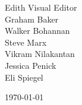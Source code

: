 \documentclass[a4paper, 10pt, oneside]{article}
\begin{document}
\begin{titlepage}
    \vspace*{75pt} %
    \begin{center}
    	{\Huge Edith Visual Editor}\\ [1cm]	%
		{\Large Graham Baker\\
Walker Bohannan\\
Steve Marx    \\
Vikram Nilakantan\\
Jessica Penick\\
Eli Spiegel \\
}

		\today %
	\end{center}
	\vspace*{\fill}
\end{titlepage}
\end{document}
